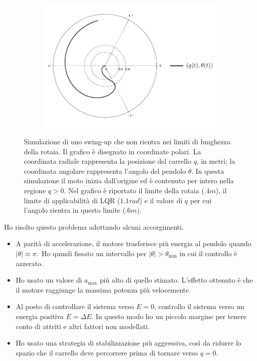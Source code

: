 \begin{figure}[h]
    \centering
    \begin{subfigure}[]{\textwidth}
        \centering
        \includegraphics[width=.8\textwidth]{assets/polar-swingup-simulation}
    \end{subfigure}

    \caption[Simulazione swing-up fallito]{
        Simulazione di uno swing-up che non rientra nei limiti di lunghezza della
        rotaia. Il grafico è disegnato in coordinate polari.
        La coordinata radiale rappresenta la posizione del carrello $q$, in metri;
        la coordinata angolare rappresenta l'angolo del pendolo $\theta$.
        In questa simulazione il moto inizia dall'origine ed è contenuto
        per intero nella regione $q > 0$.
        Nel grafico è riportato il limite della rotaia ($.4m$), il limite
        di applicabilità di LQR ($1.1rad$) e il valore di $q$ per cui l'angolo
        rientra in questo limite ($.6m$).
    }
    \label{fig:swingup-overflow}
\end{figure}

Ho risolto questo problema adottando alcuni accorgimenti.
\begin{itemize}
    \item A parità di accelerazione, il motore trasferisce più
    energia al pendolo quando $|\theta| \approx \pi$.\footnotemark\
    Ho quindi fissato un intervallo per $|\theta| > \theta_{\min} $ in cui il
    controllo è azzerato.

    \item Ho usato un valore di $a_{\max}$ più alto di quello
    stimato. L'effetto ottenuto è che il motore raggiunge la massima
    potenza più velocemente.

    \item Al posto di controllare il sistema verso $E = 0$,
    controllo il sistema verso un energia positiva $E = \Delta E$.
    In questo modo ho un piccolo margine per tenere conto di attriti
    e altri fattori non modellati.

    \item Ho usato una strategia di stabilizzazione più aggressiva,
    così da ridurre lo spazio che il carrello deve percorrere prima
    di tornare verso $q = 0$.
\end{itemize}

